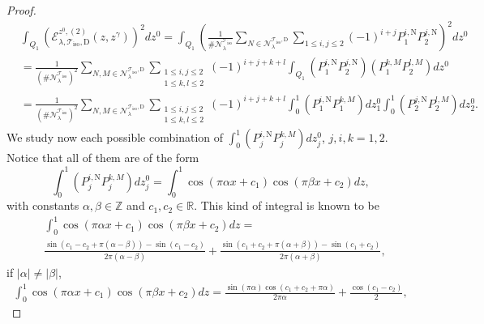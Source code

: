 \documentclass{amsart}
\theoremstyle{definition}
\theoremstyle{remark}
\renewcommand\leq\leqslant
\numberwithin{equation}{section}
\theoremstyle{definition}
\theoremstyle{remark}
\begin{document}
\begin{proof}
	\begin{equation}
		\begin{aligned}
			&\int_{Q_1}\left(\mathcal{E}_{\lambda,\mathcal{T}_\mathrm{iso},\mathrm{D}}^{z^0,(2)}(z,z^\gamma)\right)^2dz^0=\int_{Q_1}\left(\frac{1}{\#\mathcal{N}_\lambda^{\mathcal{T}_\mathrm{iso}}}\sum_{N\in\mathcal{N}_\lambda^{\mathcal{T}_\mathrm{iso},\mathrm{D}}}\sum_{1\leq i,j\leq 2}(-1)^{i+j}P_1^{i,\mathrm{N}}P_2^{j,\mathrm{N}}\right)^2dz^0\\
			&=\frac{1}{\left(\#\mathcal{N}_\lambda^{\mathcal{T}_\mathrm{iso}}\right)^2}\sum_{N,M\in\mathcal{N}_\lambda^{\mathcal{T}_\mathrm{iso},\mathrm{D}}}\sum_{\substack{1\leq i,j\leq 2\\1\leq k,l\leq 2}}(-1)^{i+j+k+l} \int_{Q_1}\left(P_1^{i,\mathrm{N}}P_2^{j,\mathrm{N}}\right)\left(P_1^{k,M}P_2^{l,M}\right)dz^0\\
			&=\frac{1}{\left(\#\mathcal{N}_\lambda^{\mathcal{T}_\mathrm{iso}}\right)^2}\sum_{N,M\in\mathcal{N}_\lambda^{\mathcal{T}_\mathrm{iso},\mathrm{D}}}\sum_{\substack{1\leq i,j\leq 2\\1\leq k,l\leq 2}}(-1)^{i+j+k+l} \int_{0}^1\left(P_1^{i,\mathrm{N}}P_1^{k,M}\right)dz_1^0\int_0^1\left(P_2^{j,\mathrm{N}}P_2^{l,M}\right)dz_2^0.
		\end{aligned}
	\end{equation}
    We study now each possible combination of $\int_{0}^{1}\left(P_j^{i,\mathrm{N}}P_j^{k,M}\right)dz_j^0$, $j,i,k=1,2$. Notice that all of them are of the form \begin{equation}
		\int_{0}^{1}\left(P_j^{i,\mathrm{N}}P_j^{k,M}\right)dz_j^0=\int_0^1\cos\left(\pi \alpha x+c_1\right)\cos\left(\pi \beta x+c_2\right)dz,
	\end{equation} with constants $\alpha,\beta\in\mathbb{Z}$ and $ c_1,c_2\in \mathbb{R}$. This kind of integral is known to be
	\begin{equation}
		\begin{aligned}
			&	\int_0^1\cos\left(\pi \alpha x+c_1\right)\cos\left(\pi \beta x+c_2\right)dz=\\&\frac{\sin\left(c_1-c_2+\pi(\alpha-\beta)\right)-\sin\left(c_1-c_2\right)}{2\pi(\alpha-\beta)}+\frac{\sin\left(c_1+c_2+\pi(\alpha+\beta)\right)-\sin\left(c_1+c_2\right)}{2\pi(\alpha+\beta)},
		\end{aligned}
	\end{equation}if $\left|\alpha\right|\neq\left|\beta\right|$,
	\begin{equation}
		\begin{aligned}
			\int_0^1\cos\left(\pi \alpha x+c_1\right)\cos\left(\pi \beta x+c_2\right)dz=\frac{\sin\left(\pi \alpha \right)\cos\left(c_1+c_2+\pi \alpha\right)}{2\pi \alpha}+\frac{\cos\left(c_1-c_2\right)}{2},

\end{aligned}
\end{equation}
\end{proof}
\end{document}
